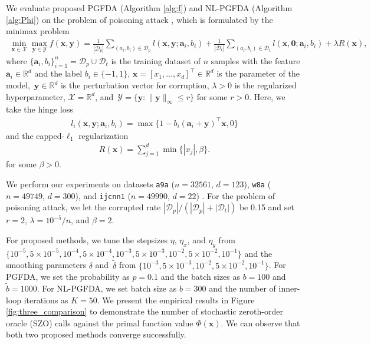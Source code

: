 \documentclass[11pt]{article}
\def\vzero{\mathbf{0}}
\def\va{\mathbf{a}}
\def\vx{\mathbf{x}}
\def\vy{\mathbf{y}}
\def\fD{{\mathcal{D}}}
\def\fX{{\mathcal{X}}}
\def\BR{{\mathbb{R}}}
\begin{document}
We evaluate proposed PGFDA (Algorithm \ref{alg:f}) and NL-PGFDA (Algorithm \ref{alg:Phi}) on the problem of poisoning attack \citep{biggio2012poisoning,huang2022accelerated,liu2020min}, which is formulated by the minimax problem
\begin{align*}
\min_{\mathbf{x}\in\mathcal{X}} \max_{\mathbf{y}\in\mathcal{Y}}
f(\vx,\vy)
= \frac{1}{|\fD_p|}\sum_{(a_i,b_i)\in\fD_p}\!\!\!\!l(\vx,\vy;\va_i,b_i) 
+ \frac{1}{|\fD_t|}\sum_{(a_i,b_i)\in\fD_t}\!\!\!\!l(\vx,\vzero;\va_i,b_i) 
+ \lambda R(\vx),
\end{align*}
where $\{\va_i,b_i\}_{i=1}^n=\fD_p\cup\fD_t$ is the training dataset of $n$ samples with the feature $\va_i\in\mathbb{R}^d$ and the label $b_i\in\{-1,1\}$, $\vx=[x_1,\dots,x_d]^\top\in\BR^d$ is the parameter of the model,~$\vy\in\BR^d$ is the perturbation vector for corruption, $\lambda>0$ is the regularized hyperparameter, $\fX=\BR^d$, and~$\mathcal{Y}=\{\vy:\|\vy\|_\infty\le r\}$ for some $r>0$.
Here, we take the hinge loss \citep{biggio2012poisoning}
\begin{align*}
l_i(\vx,\vy;\va_i,b_i)=\max\{1-b_i(\va_i+\vy)^\top \vx, 0\}    
\end{align*}
and the capped-$\ell_1$ regularization \citep{zhang2010analysis}
\begin{align*}
R(\vx)=\sum_{j=1}^d\min\{|x_j|,\beta\}.
\end{align*}
for some $\beta>0$.

We perform our experiments on datasets \texttt{a9a} ($n=32561$, $d=123$), \texttt{w8a} ($n=49749$, $d=300$), and \texttt{ijcnn1} ($n=49990$, $d=22$) \citep{chang2011libsvm}.
For the problem of poisoning attack,
we let the corrupted rate $|\fD_p|/(|\fD_p|+|\fD_t|)$ be 0.15 and set $r=2$, $\lambda=10^{-5}/n$, and $\beta=2$.

For proposed methods, we tune the stepsizes $\eta$, $\eta_x$, and $\eta_y$ from
$\{10^{-5}, 5\times 10^{-5}, 10^{-4}, 5\times 10^{-4}, 10^{-3}, 
5\times 10^{-3},10^{-2}, 5\times 10^{-2}, 10^{-1}\}$
and the smoothing parameters $\delta$ and~$\tilde\delta$ from
$\{10^{-3}, 5\times 10^{-3}, 10^{-2}, 5\times 10^{-2}, 10^{-1}\}$.
For PGFDA, we set 
the probability as $p=0.1$ and the batch sizes as $b=100$ and $\tilde{b}=1000$.
For NL-PGFDA, we set batch size as $b=300$ and the number of inner-loop iterations as $K=50$.
We present the empirical results in Figure \ref{fig:three_comparison} to demonstrate the number of stochastic zeroth-order oracle (SZO) calls against the primal function value $\Phi(\vx)$.
We can observe that both two proposed methods converge successfully.
\end{document}
